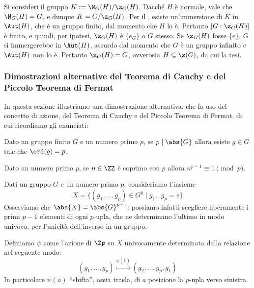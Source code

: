 \documentclass[11pt]{scrartcl}
\begin{document}
	\begin{soln}
		Si consideri il gruppo $K := \N_G(H)/\z_G(H)$. Dacché $H$ è normale,
		vale che $\N_G(H) = G$, e dunque $K = G/\z_G(H)$.
		Per il , esiste un'immersione di $K$ in $\Aut(H)$, che
		è un gruppo finito, dal momento che $H$ lo è. Pertanto $[G : \z_G(H)]$ è
		finito, e quindi, per ipotesi, $\z_G(H)$ è $\{e_G\}$ o $G$ stesso.
		Se $\z_G(H)$ fosse $\{e\}$, $G$ si immergerebbe in
		$\Aut(H)$, assurdo dal momento che $G$ è un gruppo infinito e
		$\Aut(H)$ non lo è. Pertanto
		$\z_G(H) = G$, ovverosia $H \subseteq \z(G)$, da cui la tesi.
	\end{soln}
	
	\subsubsection{Dimostrazioni alternative del Teorema di Cauchy e del Piccolo Teorema di Fermat}
	
	In questa sezione illustriamo una dimostrazione alternativa, che fa uso del concetto di
	azione, del Teorema di Cauchy e del Piccolo
	Teorema di Fermat, di cui ricordiamo gli enunciati:
	
	\begin{theorem}
		\label{teorema1.44}
		Dato un gruppo finito $G$ e un numero primo $p$, se $p \mid \abs{G}$ allora esiste 
		$g \in G$ tale che $\ord(g) = p$.
	\end{theorem}
	
	\begin{theorem}
		\label{teorema1.45}
		Dato un numero primo $p$, se $n \in \ZZ$ è coprimo con $p$ allora 
		$n^{p - 1} \equiv 1 \pmod p$.
	\end{theorem}
	
	Dati un gruppo $G$ e un numero primo $p$, consideriamo l'insieme 
	\[
	X = \{(g_1, \ldots, g_p) \in G^p\mid g_1\ldots g_p = e\}
	\]
	Osserviamo che $\abs{X} = \abs{G}^{p - 1}$: possiamo infatti scegliere liberamente
	i primi $p - 1$ elementi di ogni $p$-upla, che ne determinano l'ultimo in 
	modo univoco, per l'unicità dell'inverso in un gruppo. \medskip
	
	
	Definiamo $\psi$ come l'azione di $\Zp$ su $X$ univocamente determinata dalla relazione
	nel seguente modo:
	\[
	(g_1, \ldots, g_p) \overset{\psi(\overline{1})}{\mapsto} (g_2, \ldots, g_p, g_1)
	\]
	In particolare $\psi(\overline{a})$ ``shifta'', ossia trasla, di $a$ posizione
	la $p$-upla verso sinistra. \medskip
	
\end{document}

